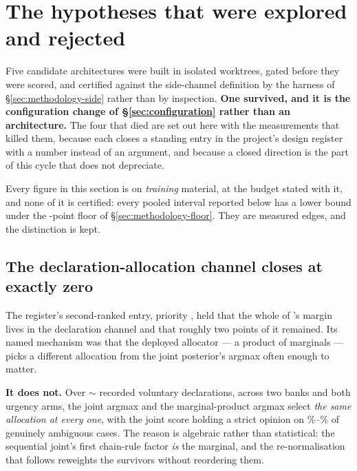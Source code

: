 \section{The hypotheses that were explored and rejected}
\label{sec:rejected}

Five candidate architectures were built in isolated worktrees, gated before they were scored, and
certified against the side-channel definition by the harness of \S\ref{sec:methodology-side} rather
than by inspection. \textbf{One survived, and it is the configuration change of
\S\ref{sec:configuration} rather than an architecture.} The four that died are set out here with the
measurements that killed them, because each closes a standing entry in the project's design register
with a number instead of an argument, and because a closed direction is the part of this cycle that
does not depreciate.

Every figure in this section is on \emph{training} material, at the budget stated with it, and none
of it is certified: every pooled interval reported below has a lower bound under the
\vsevenPrimaryFloor{}-point floor of \S\ref{sec:methodology-floor}. They are measured edges, and the
distinction is kept.

\subsection{The declaration-allocation channel closes at exactly zero}
\label{sec:rejected-alloc}

The register's second-ranked entry, priority \vsevenLonePriority{}, held that the whole of \vsix{}'s
margin lives in the declaration channel and that roughly two points of it remained. Its named
mechanism was that the deployed allocator --- a product of marginals --- picks a different allocation
from the joint posterior's argmax often enough to matter.

\textbf{It does not.} Over $\sim$\vsevenLoneDecls{} recorded voluntary declarations, across two banks
and both urgency arms, the joint argmax and the marginal-product argmax select \emph{the same
allocation at every one}, with the joint score holding a strict opinion on \vsevenLoneStrictLo\%--\vsevenLoneStrictHi\% of genuinely ambiguous cases. The reason is algebraic rather than statistical: the sequential joint's first
chain-rule factor \emph{is} the marginal, and the re-normalisation that follows reweights the
survivors without reordering them.

